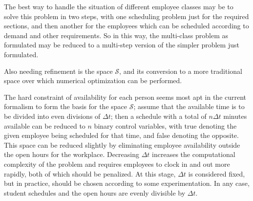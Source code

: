 \documentclass[11pt, draft]{amsart}
\def\S{\mathcal{S}}
\begin{document}
The best way to handle the situation of different employee classes may be to
solve this problem in two steps, with one scheduling problem just for the
required sections, and then another for the employees which can be scheduled
according to demand and other requirements.
So in this way, the multi-class problem as formulated may be reduced to a
multi-step version of the simpler problem just formulated.

Also needing refinement is the space $\S$, and its conversion to a more
traditional space over which numerical optimization can be performed.

The hard constraint of availability for each person seems most apt in the
current formalism to form the basis for the space $\S$; assume that the
available time is to be divided into even divisions of $\Delta t$; then a
schedule with a total of $n \Delta t$ minutes available can be reduced to $n$
binary control variables, with true denoting the given employee being scheduled
for that time, and false denoting the opposite.
This space can be reduced slightly by eliminating employee availability outside
the open hours for the workplace.
Decreasing $\Delta t$ increases the computational complexity of the problem and
requires employees to clock in and out more rapidly, both of which should be
penalized.
At this stage, $\Delta t$ is considered fixed, but in practice, should be chosen
according to some experimentation.
In any case, student schedules and the open hours are evenly divisible by
$\Delta t$.
\end{document}
